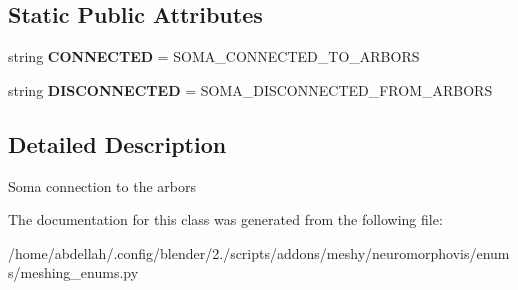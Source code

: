 \subsection*{Static Public Attributes}
\begin{DoxyCompactItemize}
\item 
string {\bfseries C\+O\+N\+N\+E\+C\+T\+ED} = \textquotesingle{}S\+O\+M\+A\+\_\+\+C\+O\+N\+N\+E\+C\+T\+E\+D\+\_\+\+T\+O\+\_\+\+A\+R\+B\+O\+RS\textquotesingle{}\hypertarget{classmeshy_1_1neuromorphovis_1_1enums_1_1meshing__enums_1_1Meshing_1_1SomaConnection_acdd1ecddbccfe26b75eb0c201c84a101}{}\label{classmeshy_1_1neuromorphovis_1_1enums_1_1meshing__enums_1_1Meshing_1_1SomaConnection_acdd1ecddbccfe26b75eb0c201c84a101}

\item 
string {\bfseries D\+I\+S\+C\+O\+N\+N\+E\+C\+T\+ED} = \textquotesingle{}S\+O\+M\+A\+\_\+\+D\+I\+S\+C\+O\+N\+N\+E\+C\+T\+E\+D\+\_\+\+F\+R\+O\+M\+\_\+\+A\+R\+B\+O\+RS\textquotesingle{}\hypertarget{classmeshy_1_1neuromorphovis_1_1enums_1_1meshing__enums_1_1Meshing_1_1SomaConnection_a0db394ce202fd3a0f21d4e956f6772dd}{}\label{classmeshy_1_1neuromorphovis_1_1enums_1_1meshing__enums_1_1Meshing_1_1SomaConnection_a0db394ce202fd3a0f21d4e956f6772dd}

\end{DoxyCompactItemize}


\subsection{Detailed Description}


\begin{DoxyVerb}Soma connection to the arbors
\end{DoxyVerb}
 

The documentation for this class was generated from the following file\+:\begin{DoxyCompactItemize}
\item 
/home/abdellah/.\+config/blender/2./scripts/addons/meshy/neuromorphovis/enums/meshing\+\_\+enums.\+py\end{DoxyCompactItemize}
